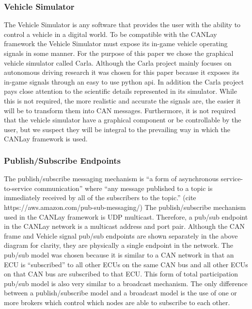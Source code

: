 \documentclass[letterpaper,twocolumn,12pt]{article}
\begin{document}
\subsubsection{Vehicle Simulator}
The Vehicle Simulator is any software that provides the user with the ability to control a vehicle in a digital world. To be compatible with the CANLay framework the Vehicle Simulator must expose its in-game vehicle operating signals in some manner. For the purpose of this paper we chose the graphical vehicle simulator called Carla. Although the Carla project mainly focuses on autonomous driving research it was chosen for this paper because it exposes its in-game signals through an easy to use python api. In addition the Carla project pays close attention to the scientific details represented in its simulator. While this is not required, the more realistic and accurate the signals are, the easier it will be to transform them into CAN messages. Furthermore, it is not required that the vehicle simulator have a graphical component or be controllable by the user, but we suspect they will be integral to the prevailing way in which the CANLay framework is used.

\subsubsection{Publish/Subscribe Endpoints}
The publish/subscribe messaging mechanism is “a form of asynchronous service-to-service communication” where “any message published to a topic is immediately received by all of the subscribers to the topic.” (cite https://aws.amazon.com/pub-sub-messaging/) The publish/subscribe mechanism used in the CANLay framework is UDP multicast. Therefore, a pub/sub endpoint in the CANLay network is a multicast address and port pair. Although the CAN frame and Vehicle signal pub/sub endpoints are shown separately in the above diagram for clarity, they are physically a single endpoint in the network. The pub/sub model was chosen because it is similar to a CAN network in that an ECU is “subscribed” to all other ECUs on the same CAN bus and all other ECUs on that CAN bus are subscribed to that ECU. This form of total participation pub/sub model is also very similar to a broadcast mechanism. The only difference between a publish/subscribe model and a broadcast model is the use of one or more brokers which control which nodes are able to subscribe to each other. 
\end{document}
